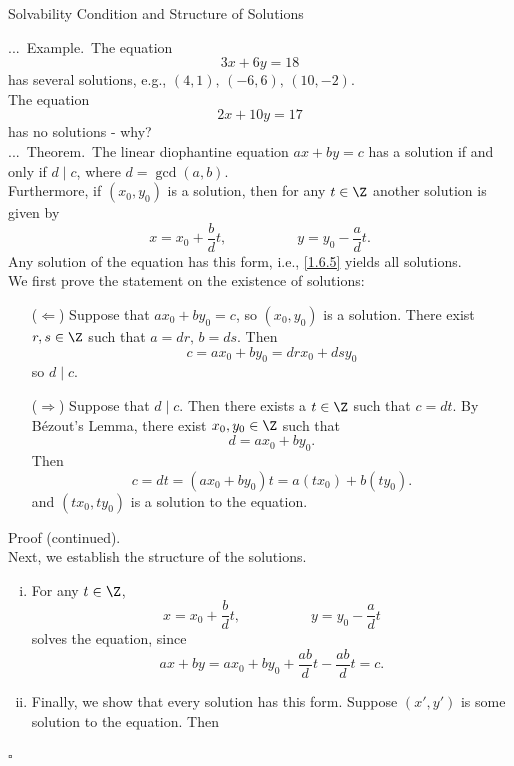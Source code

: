 \documentclass[smaller,hyperref={CJKbookmarks=true}]{beamer}
\newenvironment{PROOF}{{\noindent\!\sf\alert{Proof.}}\\}{\hfill$\square$\\}
\newcounter{zhuo}[subsection]
\renewcommand{\thezhuo}{\thesection.\thesubsection.\arabic{zhuo}}
\newenvironment{EXAMPLE}{\stepcounter{zhuo}\alert{\!\thezhuo.~Example.\,}}{}
\newenvironment{THEOREM}{\stepcounter{zhuo}\alert{\thezhuo.~Theorem.\,}}{}
\begin{document}
\begin{frame}{Solvability Condition and Structure of Solutions}
\begin{spacing}{1.05}
\begin{EXAMPLE}
The equation
\[3x+6y=18\]
has several solutions, e.g., $(4,1),\,(-6,6),\,(10,-2)$.\\
The equation
\[2x+10y=17\]
has no solutions - why?\\[4pt]
\end{EXAMPLE}
\begin{THEOREM}
The linear diophantine equation $ax+by=c$ has a solution if and only if $d\mid c$, where $d=\gcd(a,b)$.\\
Furthermore, if $(x_0,y_0)$ is a solution, then for any $t\in\Z$ another solution is given by
\begin{equation}\label{1.6.5}
x=x_0+\frac{b}{d}t,\qquad\qquad\quad
y=y_0-\frac{a}{d}t.
\end{equation}
Any solution of the equation has this form, i.e., \eqref{1.6.5} yields all solutions.
\end{THEOREM}
\newpage
\begin{PROOF}
We first prove the statement on the existence of solutions:
\begin{itemize}
  \item[($\Leftarrow$)] Suppose that $ax_0+by_0=c$, so $(x_0,y_0)$ is a solution. There exist $r,s\in\Z$ such that $a=dr,\,b=ds$. Then
      \[c=ax_0+by_0=drx_0+dsy_0\]
      so $d\mid c$.
  \item[($\Rightarrow$)] Suppose that $d\mid c$. Then there exists a $t\in\Z$ such that $c=dt$. By B\'{e}zout's Lemma, there exist $x_0,y_0\in\Z$ such that
      \[d=ax_0+by_0.\]
      Then
      \[c=dt=(ax_0+by_0)t=a(tx_0)+b(ty_0).\]
      and $(tx_0,ty_0)$ is a solution to the equation.
\end{itemize}
\newpage
\alert{Proof (continued).}\\
Next, we establish the structure of the solutions.
\begin{enumerate}[(i)]
  \item For any $t\in\Z$,
  \begin{equation}\label{1.6.6}
    x=x_0+\frac{b}{d}t,\qquad\qquad\quad
    y=y_0-\frac{a}{d}t
  \end{equation}
  solves the equation, since
  \[ax+by=ax_0+by_0+\frac{ab}{d}t-\frac{ab}{d}t=c.\]
  \item Finally, we show that every solution has this form. Suppose $(x',y')$ is some solution to the equation. Then

\end{enumerate}
\end{PROOF}
\end{spacing}
\end{frame}
\end{document}
